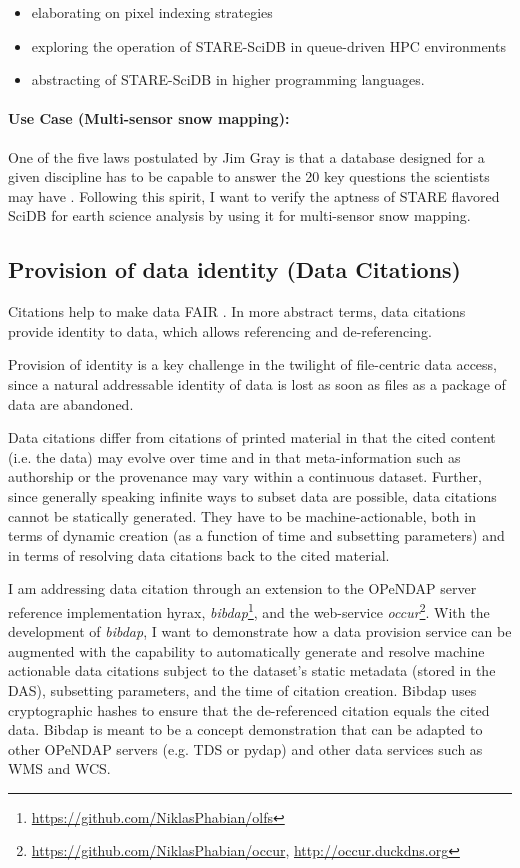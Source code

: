 \documentclass[a4paper,10pt]{article}
\begin{document}
\begin{itemize}
 \item elaborating on pixel indexing strategies
 \item exploring the operation of \gls{STARE}-SciDB in queue-driven \gls{HPC} environments
 \item abstracting of \gls{STARE}-SciDB in higher programming languages.
\end{itemize}


\paragraph{Use Case (Multi-sensor snow mapping):}
One of the five laws postulated by Jim Gray is that a database designed for a given discipline has to be capable to answer the 20 key questions the scientists may have \citep{Hey2009, Szalay2009}.
Following this spirit, I want to verify the aptness of \gls{STARE} flavored SciDB for earth science analysis by using it for multi-sensor snow mapping.

\newpage

\subsection{Provision of data identity (Data Citations)}
Citations help to make data \acrfull{FAIR} \citep{Wilkinson2016}. In more abstract terms, data citations provide identity to data, which allows referencing and de-referencing.

Provision of identity is a key challenge in the twilight of file-centric data access, since a natural addressable identity of data is lost as soon as files as a package of data are abandoned.

Data citations differ from citations of printed material in that the cited content (i.e. the data) may evolve over time and in that meta-information such as authorship or the provenance may vary within a continuous dataset. Further, since generally speaking infinite ways to subset data are possible, data citations cannot be statically generated. They have to be machine-actionable, both in terms of dynamic creation (as a function of time and subsetting parameters) and in terms of resolving data citations back to the cited material.

I am addressing data citation through an extension to the \gls{OPeNDAP} \citep{Gallagher2005} server reference implementation hyrax, \textit{bibdap}\footnote{\url{https://github.com/NiklasPhabian/olfs}},
and the web-service \textit{occur}\footnote{\url{https://github.com/NiklasPhabian/occur}, \url{http://occur.duckdns.org}}. 
With the development of \textit{bibdap}, I want to demonstrate how a data provision service can be augmented with the capability to automatically generate and resolve machine actionable data citations subject to the dataset's static metadata (stored in the \gls{DAS}), subsetting parameters, and the time of citation creation. Bibdap uses cryptographic hashes to ensure that the de-referenced citation equals the cited data. Bibdap is meant to be a concept demonstration that can be adapted to other \gls{OPeNDAP} servers (e.g. \gls{TDS} or pydap) and other data services such as \gls{WMS} and \gls{WCS}.
\end{document}
